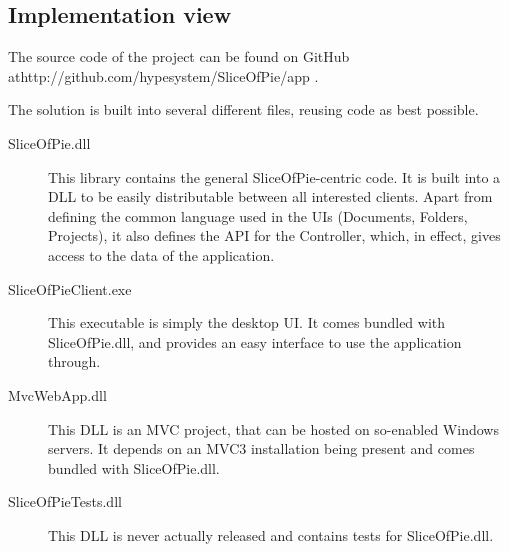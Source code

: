 \subsection{Implementation view}
\label{sec:implementationview}

The source code of the project can be found on GitHub at\newline http://github.com/hypesystem/SliceOfPie/app .

The solution is built into several different files, reusing code as best possible.

\begin{description}
    \item[SliceOfPie.dll] This library contains the general SliceOfPie-centric code. It is built into a
        DLL to be easily distributable between all interested clients. Apart from defining the common
        language used in the UIs (Documents, Folders, Projects), it also defines the API for the
        Controller, which, in effect, gives access to the data of the application.
    \item[SliceOfPieClient.exe] This executable is simply the desktop UI. It comes bundled with
        SliceOfPie.dll, and provides an easy interface to use the application through.
    \item[MvcWebApp.dll] This DLL is an MVC project, that can be hosted on so-enabled Windows servers.
        It depends on an MVC3 installation being present and comes bundled with SliceOfPie.dll.
    \item[SliceOfPieTests.dll] This DLL is never actually released and contains tests for SliceOfPie.dll.
\end{description}
